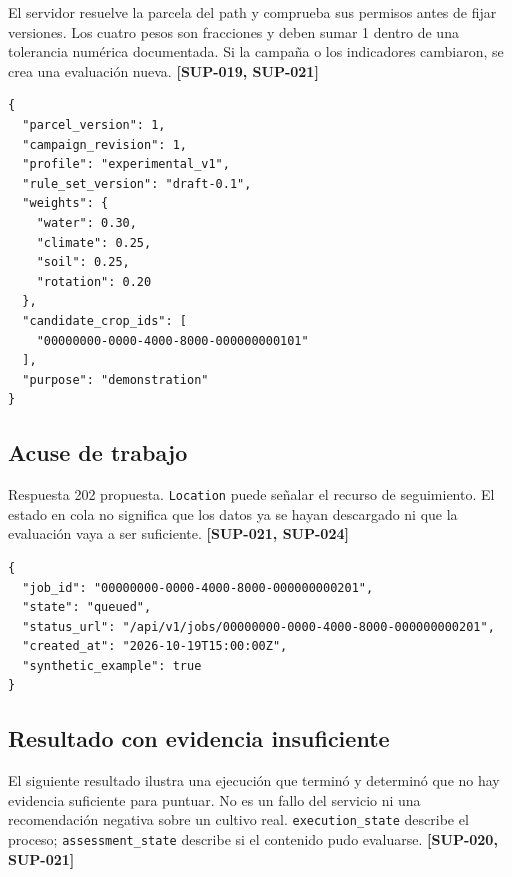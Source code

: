 \documentclass[10pt,a4paper]{article}
\begin{document}
El servidor resuelve la parcela del path y comprueba sus permisos antes de fijar versiones. Los cuatro pesos son fracciones y deben sumar 1 dentro de una tolerancia numérica documentada. Si la campaña o los indicadores cambiaron, se crea una evaluación nueva. \textbf{[SUP-019, SUP-021]}


\begin{lstlisting}
{
  "parcel_version": 1,
  "campaign_revision": 1,
  "profile": "experimental_v1",
  "rule_set_version": "draft-0.1",
  "weights": {
    "water": 0.30,
    "climate": 0.25,
    "soil": 0.25,
    "rotation": 0.20
  },
  "candidate_crop_ids": [
    "00000000-0000-4000-8000-000000000101"
  ],
  "purpose": "demonstration"
}
\end{lstlisting}

\subsection{Acuse de trabajo}

Respuesta 202 propuesta. \texttt{Location} puede señalar el recurso de seguimiento. El estado en cola no significa que los datos ya se hayan descargado ni que la evaluación vaya a ser suficiente. \textbf{[SUP-021, SUP-024]}


\begin{lstlisting}
{
  "job_id": "00000000-0000-4000-8000-000000000201",
  "state": "queued",
  "status_url": "/api/v1/jobs/00000000-0000-4000-8000-000000000201",
  "created_at": "2026-10-19T15:00:00Z",
  "synthetic_example": true
}
\end{lstlisting}

\subsection{Resultado con evidencia insuficiente}

El siguiente resultado ilustra una ejecución que terminó y determinó que no hay evidencia suficiente para puntuar. No es un fallo del servicio ni una recomendación negativa sobre un cultivo real. \texttt{execution\_\allowbreak{}state} describe el proceso; \texttt{assessment\_\allowbreak{}state} describe si el contenido pudo evaluarse. \textbf{[SUP-020, SUP-021]}
\end{document}
